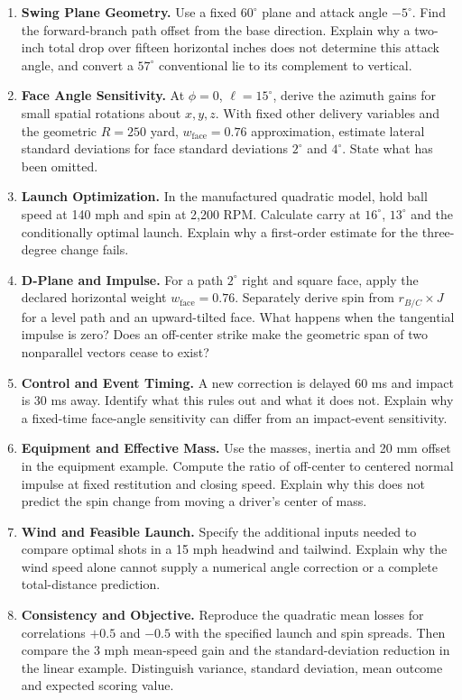 \begin{enumerate}[leftmargin=*]
\item \textbf{Swing Plane Geometry.} Use a fixed $60^\circ$ plane and
attack angle $-5^\circ$. Find the forward-branch path offset from the base
direction. Explain why a two-inch total drop over fifteen horizontal inches
does not determine this attack angle, and convert a $57^\circ$ conventional
lie to its complement to vertical.

\item \textbf{Face Angle Sensitivity.} At $\phi=0$, $\ell=15^\circ$,
derive the azimuth gains for small spatial rotations about $x,y,z$.
With fixed other delivery variables and the geometric $R=250$ yard,
$w_{\mathrm{face}}=0.76$ approximation, estimate lateral standard deviations for face
standard deviations $2^\circ$ and $4^\circ$. State what has been omitted.

\item \textbf{Launch Optimization.} In the manufactured quadratic model,
hold ball speed at 140 mph and spin at 2,200 RPM. Calculate carry at
$16^\circ$, $13^\circ$ and the conditionally optimal launch. Explain why
a first-order estimate for the three-degree change fails.

\item \textbf{D-Plane and Impulse.} For a path $2^\circ$ right and square
face, apply the declared horizontal weight $w_{\mathrm{face}}=0.76$. Separately derive spin
from $r_{B/C}\times J$ for a level path and an upward-tilted face. What
happens when the tangential impulse is zero? Does an off-center strike
make the geometric span of two nonparallel vectors cease to exist?

\item \textbf{Control and Event Timing.} A new correction is delayed
60 ms and impact is 30 ms away. Identify what this rules out and what it
does not. Explain why a fixed-time face-angle sensitivity can differ from
an impact-event sensitivity.

\item \textbf{Equipment and Effective Mass.} Use the masses, inertia
and 20 mm offset in the equipment example. Compute the ratio of off-center
to centered normal impulse at fixed restitution and closing speed. Explain
why this does not predict the spin change from moving a driver's center of mass.

\item \textbf{Wind and Feasible Launch.} Specify the additional inputs
needed to compare optimal shots in a 15 mph headwind and tailwind. Explain
why the wind speed alone cannot supply a numerical angle correction or a
complete total-distance prediction.

\item \textbf{Consistency and Objective.} Reproduce the quadratic mean
losses for correlations $+0.5$ and $-0.5$ with the specified launch and spin
spreads. Then compare the 3 mph mean-speed gain and the standard-deviation
reduction in the linear example. Distinguish variance, standard deviation,
mean outcome and expected scoring value.
\end{enumerate}

